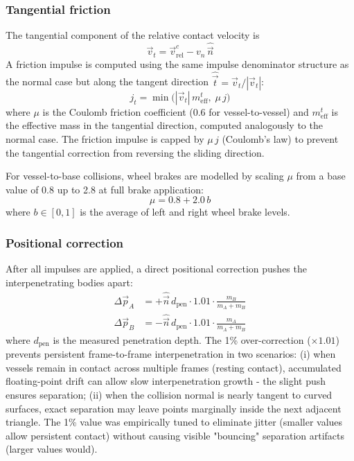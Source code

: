 \documentclass[Orbiter Technical Reference.tex]{subfiles}
\begin{document}
\subsubsection{Tangential friction}
The tangential component of the relative contact velocity is
\begin{equation*}
\vec{v}_t = \vec{v}_{\mathrm{rel}}^c - v_n\,\hat{\vec{n}}
\end{equation*}
A friction impulse is computed using the same impulse denominator structure
as the normal case but along the tangent direction
$\hat{\vec{t}} = \vec{v}_t / |\vec{v}_t|$:
\begin{equation}
j_t = \min\!\bigl(|\vec{v}_t|\,m_{\mathrm{eff}}^t,\;\mu\,j\bigr)
\label{eq:friction}
\end{equation}
where $\mu$ is the Coulomb friction coefficient (0.6 for vessel-to-vessel)
and $m_{\mathrm{eff}}^t$ is the effective mass in the tangential direction,
computed analogously to the normal case.
The friction impulse is capped by $\mu\,j$ (Coulomb's law) to prevent
the tangential correction from reversing the sliding direction.

For vessel-to-base collisions, wheel brakes are modelled by scaling $\mu$
from a base value of 0.8 up to 2.8 at full brake application:
\begin{equation*}
\mu = 0.8 + 2.0\,b
\end{equation*}
where $b \in [0,1]$ is the average of left and right wheel brake levels.

\subsubsection{Positional correction}
After all impulses are applied, a direct positional correction
pushes the interpenetrating bodies apart:
\begin{equation}
\begin{aligned}
\Delta\vec{p}_A &= +\hat{\vec{n}}\,d_{\mathrm{pen}} \cdot 1.01 \cdot
                    \frac{m_B}{m_A + m_B} \\[4pt]
\Delta\vec{p}_B &= -\hat{\vec{n}}\,d_{\mathrm{pen}} \cdot 1.01 \cdot
                    \frac{m_A}{m_A + m_B}
\end{aligned}
\label{eq:pos_correction}
\end{equation}
where $d_{\mathrm{pen}}$ is the measured penetration depth.
The 1\% over-correction ($\times 1.01$) prevents persistent
frame-to-frame interpenetration in two scenarios: (i) when vessels
remain in contact across multiple frames (resting contact), accumulated
floating-point drift can allow slow interpenetration growth - the slight
push ensures separation; (ii) when the collision normal is nearly 
tangent to curved surfaces, exact separation may leave points marginally
inside the next adjacent triangle. The 1\% value was empirically tuned
to eliminate jitter (smaller values allow persistent contact) without
causing visible "bouncing" separation artifacts (larger values would).
\end{document}
